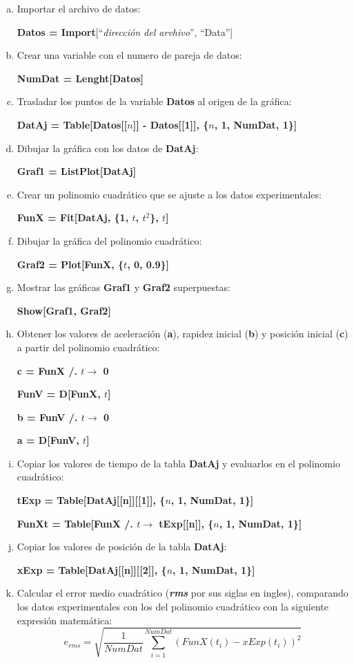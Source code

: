\documentclass[12pt, titlepage]{report}
\begin{document}
    \begin{enumerate}[a), topsep=0.5cm]
        \item Importar el archivo de datos:
        
        \centerline{\textbf{Datos = Import}[``\textit{dirección del arvhivo}'', ``Data'']}
        \item Crear una variable con el numero de pareja de datos: 
        
        \centerline{\textbf{NumDat = Lenght[Datos]}}
        \item Trasladar los puntos de la variable \textbf{Datos} al origen de la gráfica:
    
        \centerline{\textbf{DatAj = Table[Datos[[$n$]] - Datos[[1]], \{$n$, 1, NumDat, 1\}]}}
        \item Dibujar la gráfica con los datos de \textbf{DatAj}:
        
        \centerline{\textbf{Graf1 = ListPlot[DatAj]}}
        \item Crear un polinomio cuadrático que se ajuste a los datos experimentales: 
        
        \centerline{\textbf{FunX = Fit[DatAj, \{1, $t$, $t^2$\}, $t$]}}
        \item Dibujar la gráfica del polinomio cuadrático: 
        
        \centerline{\textbf{Graf2 = Plot[FunX, \{$t$, 0, 0.9\}]}}
        \item Mostrar las gráficas \textbf{Graf1} y \textbf{Graf2} superpuestas:
        
        \centerline{\textbf{Show[Graf1, Graf2]}}
        \item Obtener los valores de aceleración (\textbf{a}), rapidez inicial (\textbf{b}) y posición inicial (\textbf{c}) a partir del polinomio cuadrático:
        
        \centerline{\textbf{c = FunX /. $t \rightarrow$ 0}}
        \centerline{\textbf{FunV = D[FunX, $t$]}}
        \centerline{\textbf{b = FunV /. $t \rightarrow$ 0}}
        \centerline{\textbf{a = D[FunV, $t$]}}
        \item Copiar los valores de tiempo de la tabla \textbf{DatAj} y evaluarlos en el polinomio cuadrático:
        
        \centerline{\textbf{tExp = Table[DatAj[[n]][[1]], \{$n$, 1, NumDat, 1\}]}}
        \centerline{\textbf{FunXt = Table[FunX /. $t \rightarrow$ tExp[[n]], \{$n$, 1, NumDat, 1\}]}}
        \item Copiar los valores de posición de la tabla \textbf{DatAj}:
        
        \centerline{\textbf{xExp = Table[DatAj[[n]][[2]], \{$n$, 1, NumDat, 1\}]}}
        \item Calcular el error medio cuadrático (\textit{\textbf{rms}} por sus siglas en ingles), comparando los datos experimentales con los del polinomio cuadrático con la siguiente expresión matemática:
        $$e_{rms}=\sqrt{\frac{1}{NumDat} \sum_{i=1}^{NumDat}(FunX(t_i)-xExp(t_i))^2}$$
    \end{enumerate}
\end{document}
